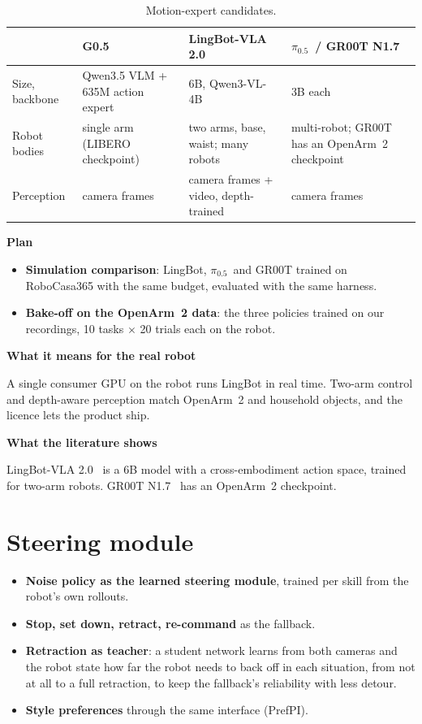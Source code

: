 \documentclass[11pt,a4paper]{article}
\newcommand{\pzf}{$\pi_{0.5}$}
\newcommand{\sub}[1]{\par\needspace{4\baselineskip}\smallskip\noindent\textbf{#1}\par}
\begin{document}
\begin{table}[!htbp]\centering\small
\begin{tabularx}{\textwidth}{P{2.4cm}YYY}
\toprule
& \textbf{G0.5} & \textbf{LingBot-VLA 2.0} & \pzf\ / GR00T N1.7 \\
\midrule
Size, backbone & Qwen3.5 VLM + 635M action expert & 6B, Qwen3-VL-4B & 3B each \\
Robot bodies & single arm (LIBERO checkpoint) & two arms, base, waist; many robots & multi-robot; GR00T has an OpenArm~2 checkpoint \\
Perception & camera frames & camera frames + video, depth-trained & camera frames \\
\bottomrule
\end{tabularx}
\caption{Motion-expert candidates.}
\end{table}

\sub{Plan}
\begin{itemize}
\item \textbf{Simulation comparison}: LingBot, \pzf\ and GR00T trained on RoboCasa365 with the same budget, evaluated with the same harness.
\item \textbf{Bake-off on the OpenArm~2 data}: the three policies trained on our recordings, 10 tasks $\times$ 20 trials each on the robot.
\end{itemize}

\sub{What it means for the real robot}
A single consumer GPU on the robot runs LingBot in real time. Two-arm control and depth-aware perception match OpenArm~2 and household objects, and the licence lets the product ship.

\sub{What the literature shows}
LingBot-VLA 2.0~\cite{lingbot2} is a 6B model with a cross-embodiment action space, trained for two-arm robots. GR00T N1.7~\cite{gr00t} has an OpenArm~2 checkpoint.

\section{Steering module}
\label{sec:prop-steer}
\begin{itemize}
\item \textbf{Noise policy as the learned steering module}, trained per skill from the robot's own rollouts.
\item \textbf{Stop, set down, retract, re-command} as the fallback.
\item \textbf{Retraction as teacher}: a student network learns from both cameras and the robot state how far the robot needs to back off in each situation, from not at all to a full retraction, to keep the fallback's reliability with less detour.
\item \textbf{Style preferences} through the same interface (PrefPI).
\end{itemize}
\end{document}
